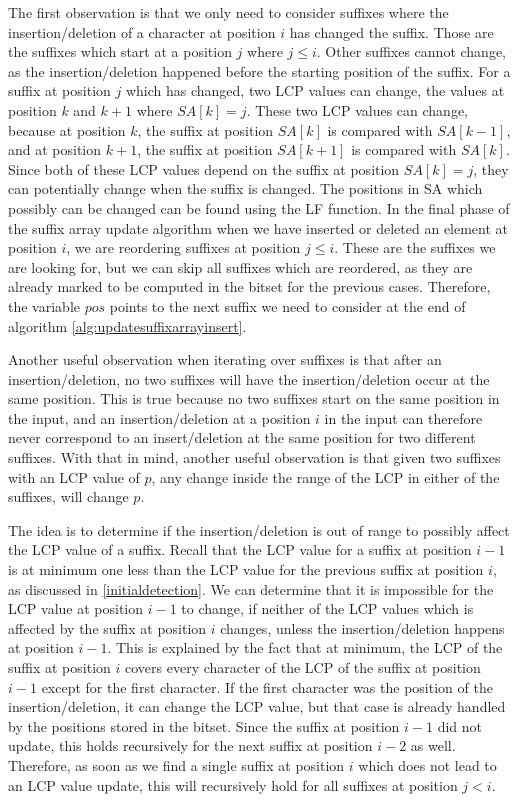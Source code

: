 The first observation is that we only need to consider suffixes where the
insertion/deletion of a character at position $i$ has changed the suffix. Those are the
suffixes which start at a position $j$ where $j \leq i$. Other suffixes cannot change, as
the insertion/deletion happened before the starting position of the suffix. For a suffix
at position $j$ which has changed, two LCP values can change, the values at position $k$
and $k + 1$ where $SA[k] = j$. These two LCP values can change, because at position $k$,
the suffix at position $SA[k]$ is compared with $SA[k - 1]$, and at position $k + 1$, the
suffix at position $SA[k + 1]$ is compared with $SA[k]$. Since both of these LCP values
depend on the suffix at position $SA[k] = j$, they can potentially change when the suffix
is changed. The positions in SA which possibly can be changed can be found using the LF
function. In the final phase of the suffix array update algorithm when we have inserted or
deleted an element at position $i$, we are reordering suffixes at position $j \leq i$.
These are the suffixes we are looking for, but we can skip all suffixes which are
reordered, as they are already marked to be computed in the bitset for the previous cases.
Therefore, the variable $pos$ points to the next suffix we need to consider at the end of
algorithm \ref{alg:updatesuffixarrayinsert}.

Another useful observation when iterating over suffixes is that after an
insertion/deletion, no two suffixes will have the insertion/deletion occur at the same
position. This is true because no two suffixes start on the same position in the input,
and an insertion/deletion at a position $i$ in the input can therefore never correspond to
an insert/deletion at the same position for two different suffixes. With that in mind,
another useful observation is that given two suffixes with an LCP value of $p$, any change
inside the range of the LCP in either of the suffixes, will change $p$.

The idea is to determine if the insertion/deletion is out of range to possibly affect the
LCP value of a suffix. Recall that the LCP value for a suffix at position $i - 1$ is at
minimum one less than the LCP value for the previous suffix at position $i$, as discussed
in \cref{initialdetection}. We can determine that it is impossible for the LCP value at
position $i - 1$ to change, if neither of the LCP values which is affected by the suffix
at position $i$ changes, unless the insertion/deletion happens at position $i - 1$. This
is explained by the fact that at minimum, the LCP of the suffix at position $i$ covers
every character of the LCP of the suffix at position $i - 1$ except for the first
character. If the first character was the position of the insertion/deletion, it can
change the LCP value, but that case is already handled by the positions stored in the
bitset. Since the suffix at position $i - 1$ did not update, this holds recursively for
the next suffix at position $i - 2$ as well. Therefore, as soon as we find a single suffix
at position $i$ which does not lead to an LCP value update, this will recursively hold for
all suffixes at position $j < i$.

